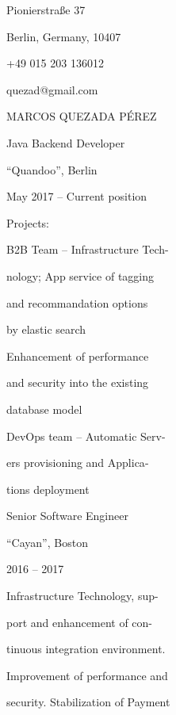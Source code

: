 \documentclass[
]{article}
\date{}
\begin{document}
\protect\hypertarget{f3}{}{Pionierstraße 37}

\protect\hypertarget{f3}{}{Berlin, Germany, 10407}

\protect\hypertarget{f3}{}{+49 015 203 136012}

\protect\hypertarget{f3}{}{quezad@gmail.com}

\protect\hypertarget{f1}{}{MARCOS QUEZADA PÉREZ}

\protect\hypertarget{f1}{}{Java Backend Developer}

\protect\hypertarget{f1}{}{``Quandoo'', Berlin}

\protect\hypertarget{f4}{}{May 2017 -- Current position}

\protect\hypertarget{f1}{}{Projects:}

\protect\hypertarget{f3}{}{B2B Team -- Infrastructure
Tech}\protect\hypertarget{f2}{}{-}

\protect\hypertarget{f2}{}{nology; App service of tagging}

\protect\hypertarget{f3}{}{and recommandation options}

\protect\hypertarget{f3}{}{by elastic search}

\protect\hypertarget{f2}{}{Enhancement of performance}

\protect\hypertarget{f3}{}{and security into the existing}

\protect\hypertarget{f3}{}{database model}

\protect\hypertarget{f3}{}{DevOps team -- Automatic
Serv}\protect\hypertarget{f2}{}{-}

\protect\hypertarget{f3}{}{ers provisioning and
Applica}\protect\hypertarget{f2}{}{-}

\protect\hypertarget{f3}{}{tions deployment}

\protect\hypertarget{f4}{}{Senior Software Engineer}

\protect\hypertarget{f1}{}{``Cayan'', Boston}

\protect\hypertarget{f1}{}{2016 -- 2017}

\protect\hypertarget{f2}{}{Infrastructure Technology, sup-}

\protect\hypertarget{f3}{}{port and enhancement of
con}\protect\hypertarget{f2}{}{-}

\protect\hypertarget{f3}{}{tinuous integration environment.}

\protect\hypertarget{f3}{}{Improvement of performance and}

\protect\hypertarget{f3}{}{security. Stabilization of Payment}
\end{document}
